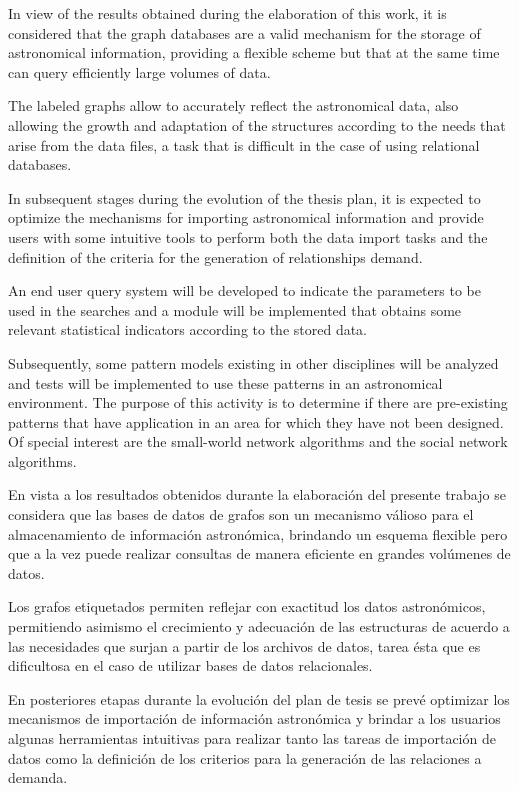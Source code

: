 \ifdefined\ingles	

	In view of the results obtained during the elaboration of this work, it is considered that the graph databases are a valid mechanism for the storage of astronomical information, providing a flexible scheme but that at the same time can query efficiently large volumes of data.
	
	The labeled graphs allow to accurately reflect the astronomical data, also allowing the growth and adaptation of the structures according to the needs that arise from the data files, a task that is difficult in the case of using relational databases.
	
	In subsequent stages during the evolution of the thesis plan, it is expected to optimize the mechanisms for importing astronomical information and provide users with some intuitive tools to perform both the data import tasks and the definition of the criteria for the generation of relationships demand.
	
	An end user query system will be developed to indicate the parameters to be used in the searches and a module will be implemented that obtains some relevant statistical indicators according to the stored data.
	
	Subsequently, some pattern models existing in other disciplines will be analyzed and tests will be implemented to use these patterns in an astronomical environment. The purpose of this activity is to determine if there are pre-existing patterns that have application in an area for which they have not been designed. Of special interest are the small-world network algorithms\cite{kleinberg2000navigation} and the social network algorithms\cite{carrington2005models}.

\else

	En vista a los resultados obtenidos durante la elaboración del presente trabajo se considera que las bases de datos de grafos son un mecanismo válioso para el almacenamiento de información astronómica, brindando un esquema flexible pero que a la vez puede realizar consultas de manera eficiente en grandes volúmenes de datos.
	
	Los grafos etiquetados permiten reflejar con exactitud los datos astronómicos, permitiendo asimismo el crecimiento y adecuación de las estructuras de acuerdo a las necesidades que surjan a partir de los archivos de datos, tarea ésta que es dificultosa en el caso de utilizar bases de datos relacionales.
	
	En posteriores etapas durante la evolución del plan de tesis se prevé optimizar los mecanismos de importación de información astronómica y brindar a los usuarios algunas herramientas intuitivas para realizar tanto las tareas de importación de datos como la definición de los criterios para la generación de las relaciones a demanda.
	
